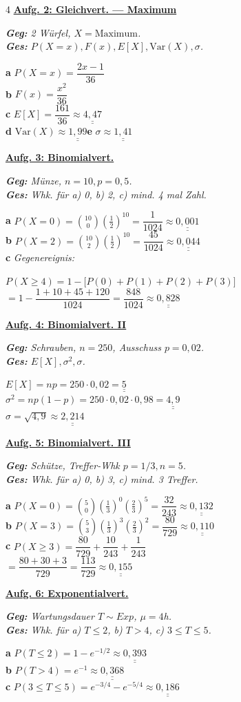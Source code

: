 \documentclass[landscape,a4paper,8pt]{article}
\newcommand{\aufgabe}[1]{\vspace{1pt}\textbf{\underline{#1}}\par}
\newcommand{\teil}[1]{\textbf{#1}\;}
\newcommand{\erkl}[1]{{\small\textit{#1}}\par}
\newcommand{\erg}[1]{\underline{\underline{#1}}}
\begin{document}
\begin{multicols*}{4}
\aufgabe{Aufg. 2: Gleichvert. — Maximum}
\erkl{\textbf{Geg:} 2 Würfel, $X = \text{Maximum}$.\\\textbf{Ges:} $P(X{=}x), F(x), E[X], \mathrm{Var}(X), \sigma$.}
\teil{a} $P(X{=}x)=\dfrac{2x-1}{36}$\\
\teil{b} $F(x)=\dfrac{x^2}{36}$\\
\teil{c} $E[X]=\dfrac{161}{36}\approx\erg{4{,}47}$\\
\teil{d} $\mathrm{Var}(X)\approx\erg{1{,}99}$\quad\teil{e} $\sigma\approx\erg{1{,}41}$

\aufgabe{Aufg. 3: Binomialvert.}
\erkl{\textbf{Geg:} Münze, $n=10, p=0{,}5$.\\\textbf{Ges:} Whk. für a) 0, b) 2, c) mind. 4 mal Zahl.}
\teil{a} $P(X{=}0)=\binom{10}{0}\!\left(\tfrac{1}{2}\right)^{10}=\dfrac{1}{1024}\approx\erg{0{,}001}$\\
\teil{b} $P(X{=}2)=\binom{10}{2}\!\left(\tfrac{1}{2}\right)^{10}=\dfrac{45}{1024}\approx\erg{0{,}044}$\\
\teil{c} \erkl{Gegenereignis:}
$P(X\geq4)=1-\bigl[P(0)+P(1)+P(2)+P(3)\bigr]$\\
$=1-\dfrac{1+10+45+120}{1024}=\dfrac{848}{1024}\approx\erg{0{,}828}$

\aufgabe{Aufg. 4: Binomialvert. II}
\erkl{\textbf{Geg:} Schrauben, $n=250$, Ausschuss $p=0{,}02$.\\\textbf{Ges:} $E[X], \sigma^2, \sigma$.}
$E[X]=np=250\cdot0{,}02=\erg{5}$\\
$\sigma^2=np(1-p)=250\cdot0{,}02\cdot0{,}98=\erg{4{,}9}$\\
$\sigma=\sqrt{4{,}9}\approx\erg{2{,}214}$

\aufgabe{Aufg. 5: Binomialvert. III}
\erkl{\textbf{Geg:} Schütze, Treffer-Whk $p=1/3, n=5$.\\\textbf{Ges:} Whk. für a) 0, b) 3, c) mind. 3 Treffer.}
\teil{a} $P(X{=}0)=\binom{5}{0}\!\left(\tfrac{1}{3}\right)^0\!\left(\tfrac{2}{3}\right)^5=\dfrac{32}{243}\approx\erg{0{,}132}$\\
\teil{b} $P(X{=}3)=\binom{5}{3}\!\left(\tfrac{1}{3}\right)^3\!\left(\tfrac{2}{3}\right)^2=\dfrac{80}{729}\approx\erg{0{,}110}$\\
\teil{c} $P(X\geq3)=\dfrac{80}{729}+\dfrac{10}{243}+\dfrac{1}{243}$\\
$=\dfrac{80+30+3}{729}=\dfrac{113}{729}\approx\erg{0{,}155}$

\columnbreak

\aufgabe{Aufg. 6: Exponentialvert.}
\erkl{\textbf{Geg:} Wartungsdauer $T \sim Exp$, $\mu=4$h.\\\textbf{Ges:} Whk. für a) $T \leq 2$, b) $T > 4$, c) $3 \leq T \leq 5$.}
\teil{a} $P(T\leq2)=1-e^{-1/2}\approx\erg{0{,}393}$\\
\teil{b} $P(T>4)=e^{-1}\approx\erg{0{,}368}$\\
\teil{c} $P(3\leq T\leq5)=e^{-3/4}-e^{-5/4}\approx\erg{0{,}186}$


\end{multicols*}
\end{document}
